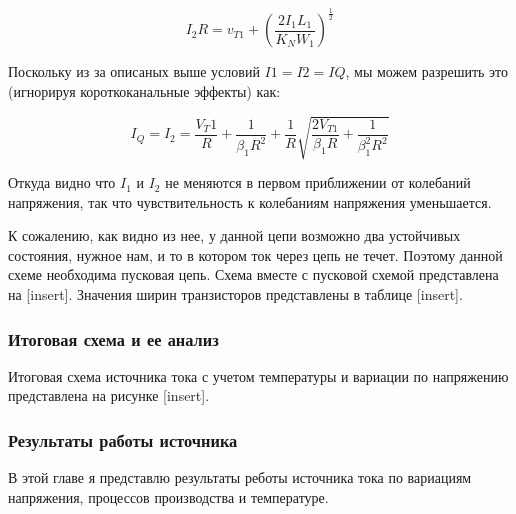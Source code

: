 \documentclass[a4paper,12pt]{article} %
\begin{document}
 $$ I_2 R = v_{T1} + ( \frac{2I_1 L_1}{ K_N W_1})^{\frac{1}{2}} $$

 Поскольку из за описаных выше условий $ I1=I2=IQ $, мы можем разрешить это (игнорируя короткоканальные эффекты) как:

\begin{equation}
    I_Q = I_2 =  \frac{V_T1}{R} + \frac{1}{\beta_1 R^2} + \frac{1}{R} \sqrt{ \frac{2 V_{T1}}{\beta_1 R} + \frac{1}{\beta_1^2 R^2}}
\end{equation}

Откуда видно что $I_1$ и $I_2$ не меняются в первом приближении от колебаний напряжения, так что чувствительность к колебаниям напряжения уменьшается. 


К сожалению, как видно из нее, у данной цепи возможно два устойчивых состояния, нужное нам, и то в котором ток через цепь не течет. Поэтому данной схеме необходима пусковая цепь\cite{op_amp_comp13}. Схема вместе с пусковой схемой представлена на  [insert]. Значения ширин транзисторов представлены в таблице [insert]. 

\subsubsection{Итоговая схема и ее анализ}

Итоговая схема источника тока с учетом температуры и вариации по напряжению представлена на рисунке [insert]. 







\subsubsection{Результаты работы источника}


В этой главе я представлю результаты реботы источника тока по вариациям напряжения, процессов производства и температуре.
\end{document}
